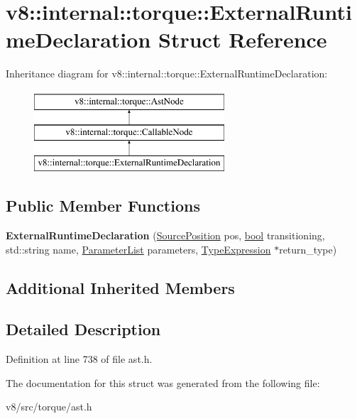\hypertarget{structv8_1_1internal_1_1torque_1_1ExternalRuntimeDeclaration}{}\section{v8\+:\+:internal\+:\+:torque\+:\+:External\+Runtime\+Declaration Struct Reference}
\label{structv8_1_1internal_1_1torque_1_1ExternalRuntimeDeclaration}
Inheritance diagram for v8\+:\+:internal\+:\+:torque\+:\+:External\+Runtime\+Declaration\+:\begin{figure}[H]
\begin{center}
\leavevmode
\includegraphics[height=3.000000cm]{structv8_1_1internal_1_1torque_1_1ExternalRuntimeDeclaration}
\end{center}
\end{figure}
\subsection*{Public Member Functions}
\begin{DoxyCompactItemize}
\item 
\mbox{\label{structv8_1_1internal_1_1torque_1_1ExternalRuntimeDeclaration_a1282c95f745ca2f0381411871c3838ec}} 
{\bfseries External\+Runtime\+Declaration} (\mbox{\hyperlink{structv8_1_1internal_1_1torque_1_1SourcePosition}{Source\+Position}} pos, \mbox{\hyperlink{classbool}{bool}} transitioning, std\+::string name, \mbox{\hyperlink{structv8_1_1internal_1_1torque_1_1ParameterList}{Parameter\+List}} parameters, \mbox{\hyperlink{structv8_1_1internal_1_1torque_1_1TypeExpression}{Type\+Expression}} $\ast$return\+\_\+type)
\end{DoxyCompactItemize}
\subsection*{Additional Inherited Members}


\subsection{Detailed Description}


Definition at line 738 of file ast.\+h.



The documentation for this struct was generated from the following file\+:\begin{DoxyCompactItemize}
\item 
v8/src/torque/ast.\+h\end{DoxyCompactItemize}
